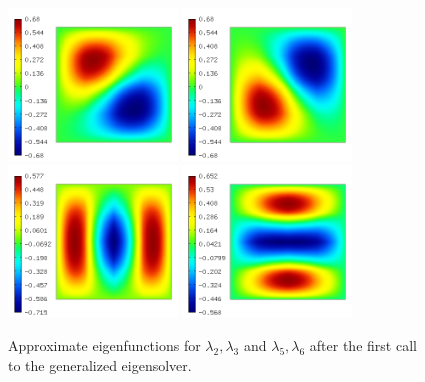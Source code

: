 \documentclass[preprint ,12pt]{elsarticle}
\begin{document}
\begin{figure}[!ht]
\begin{center}
\includegraphics[width=0.4\textwidth]{img/eigen_1.png}
\includegraphics[width=0.4\textwidth]{img/eigen_2.png}\\
\includegraphics[width=0.4\textwidth]{img/eigen_3.png}
\includegraphics[width=0.4\textwidth]{img/eigen_4.png}\\
\end{center}
\vspace{-5mm}
\caption{Approximate eigenfunctions for $\lambda_2, \lambda_3$ and 
$\lambda_5, \lambda_6$ after the first call to the generalized eigensolver.}
\label{fig:eigen1}
\end{figure}
\end{document}
